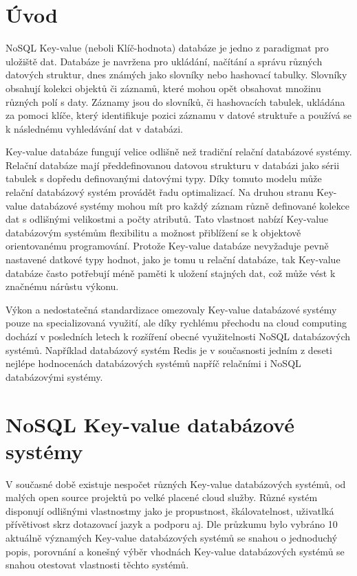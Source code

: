 \documentclass[czech,bachelor,dept460,male,csharp,cpdeclaration]{diploma}
\begin{document}
	
	\MakeTitlePages
	
	\chapter{Úvod}
	
	NoSQL Key-value (neboli Klíč-hodnota) databáze\cite{wiki-key-value-db} je jedno z paradigmat pro uložiště dat. Databáze je navržena pro ukládání, načítání a správu různých datových struktur, dnes známých jako slovníky nebo hashovací tabulky. Slovníky obsahují kolekci objektů či záznamů, které mohou opět obsahovat množinu různých polí s daty. Záznamy jsou do slovníků, či hashovacích tabulek, ukládána za pomoci klíče, který identifikuje pozici záznamu v datové struktuře a používá se k následnému vyhledávání dat v databázi.
	
	Key-value databáze fungují velice odlišně než tradiční relační databázové systémy. Relační databáze mají předdefinovanou datovou strukturu v databázi jako sérii tabulek s dopředu definovanými datovými typy. Díky tomuto modelu může relační databázový systém provádět řadu optimalizací. Na druhou stranu Key-value databázové systémy mohou mít pro každý záznam různě definované kolekce dat s odlišnými velikostmi a počty atributů. Tato vlastnost nabízí Key-value databázovým systémům flexibilitu a možnost přiblížení se k objektově orientovanému programování. Protože Key-value databáze nevyžaduje pevně nastavené datkové typy hodnot, jako je tomu u relační databáze, tak Key-value databáze často potřebují méně paměti k uložení stajných dat, což může vést k značnému nárůstu výkonu.
	
	Výkon a nedostatečná standardizace omezovaly Key-value databázové systémy pouze na specializovaná využití, ale díky rychlému přechodu na cloud computing dochází v posledních letech k rozšíření obecné využitelnosti NoSQL databázových systémů. Například databázový systém Redis\cite{redis} je v současnosti jedním z deseti nejlépe hodnocenách\cite{db-engineers-ranking} databázových systémů napříč relačními i NoSQL databázovými systémy.
	
	\chapter{NoSQL Key-value databázové systémy}
	
	V současné době existuje nespočet různých Key-value databázových systémů, od malých open source projektů po velké placené cloud služby. Různé systém disponují odlišnými vlastnostmy jako je propustnost, škálovatelnost, uživatlká přívětivost skrz dotazovací jazyk a podporu aj. Dle průzkumu\cite{predictiveanalyticstoday}\cite{g2}\cite{db-engineers-ranking}  bylo vybráno 10 aktuálně významých Key-value databázových systémů se snahou o jednoduchý popis, porovnání a konešný výběr vhodnách Key-value databázových systémů se snahou otestovat vlastnosti těchto systémů.
	
\end{document}
